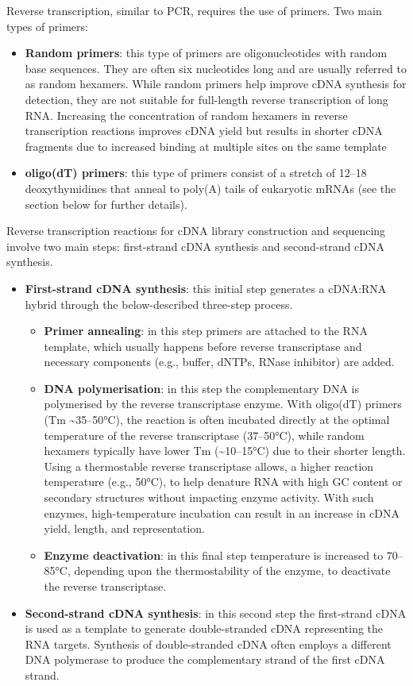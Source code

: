 \documentclass[
]{book}
\begin{document}
Reverse transcription, similar to PCR, requires the use of primers. Two main types of primers:

\begin{itemize}
\item
  \textbf{Random primers}: this type of primers are oligonucleotides with random base sequences. They are often six nucleotides long and are usually referred to as random hexamers. While random primers help improve cDNA synthesis for detection, they are not suitable for full-length reverse transcription of long RNA. Increasing the concentration of random hexamers in reverse transcription reactions improves cDNA yield but results in shorter cDNA fragments due to increased binding at multiple sites on the same template
\item
  \textbf{oligo(dT) primers}: this type of primers consist of a stretch of 12--18 deoxythymidines that anneal to poly(A) tails of eukaryotic mRNAs (see the section below for further details).
\end{itemize}

Reverse transcription reactions for cDNA library construction and sequencing involve two main steps: first-strand cDNA synthesis and second-strand cDNA synthesis.

\begin{itemize}
\item
  \textbf{First-strand cDNA synthesis}: this initial step generates a cDNA:RNA hybrid through the below-described three-step process.

  \begin{itemize}
  \item
    \textbf{Primer annealing}: in this step primers are attached to the RNA template, which usually happens before reverse transcriptase and necessary components (e.g., buffer, dNTPs, RNase inhibitor) are added.
  \item
    \textbf{DNA polymerisation}: in this step the complementary DNA is polymerised by the reverse transcriptase enzyme. With oligo(dT) primers (Tm \textasciitilde35--50°C), the reaction is often incubated directly at the optimal temperature of the reverse transcriptase (37--50°C), while random hexamers typically have lower Tm (\textasciitilde10--15°C) due to their shorter length. Using a thermostable reverse transcriptase allows, a higher reaction temperature (e.g., 50°C), to help denature RNA with high GC content or secondary structures without impacting enzyme activity. With such enzymes, high-temperature incubation can result in an increase in cDNA yield, length, and representation.
  \item
    \textbf{Enzyme deactivation}: in this final step temperature is increased to 70--85°C, depending upon the thermostability of the enzyme, to deactivate the reverse transcriptase.
  \end{itemize}
\item
  \textbf{Second-strand cDNA synthesis}: in this second step the first-strand cDNA is used as a template to generate double-stranded cDNA representing the RNA targets. Synthesis of double-stranded cDNA often employs a different DNA polymerase to produce the complementary strand of the first cDNA strand.
\end{itemize}
\end{document}
